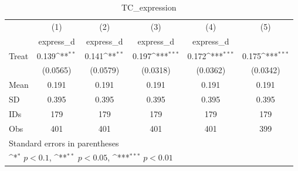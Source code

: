 \begin{table}[htbp]\centering
\def\sym#1{\ifmmode^{#1}\else\(^{#1}\)\fi}
\caption{TC\_expression}
\begin{tabular}{l*{5}{c}}
\hline\hline
                                &\multicolumn{1}{c}{(1)}&\multicolumn{1}{c}{(2)}&\multicolumn{1}{c}{(3)}&\multicolumn{1}{c}{(4)}&\multicolumn{1}{c}{(5)}\\
                                &\multicolumn{1}{c}{express\_d}&\multicolumn{1}{c}{express\_d}&\multicolumn{1}{c}{express\_d}&\multicolumn{1}{c}{express\_d}&\multicolumn{1}{c}{}\\
\hline
Treat                           &    0.139\sym{**} &    0.141\sym{**} &    0.197\sym{***}&    0.172\sym{***}&    0.175\sym{***}\\
                                & (0.0565)         & (0.0579)         & (0.0318)         & (0.0362)         & (0.0342)         \\
\hline
Mean                            &    0.191         &    0.191         &    0.191         &    0.191         &    0.191         \\
SD                              &    0.395         &    0.395         &    0.395         &    0.395         &    0.395         \\
IDs                             &      179         &      179         &      179         &      179         &      179         \\
Obs                             &      401         &      401         &      401         &      401         &      399         \\
\hline\hline
\multicolumn{6}{l}{\footnotesize Standard errors in parentheses}\\
\multicolumn{6}{l}{\footnotesize \sym{*} \(p<0.1\), \sym{**} \(p<0.05\), \sym{***} \(p<0.01\)}\\
\end{tabular}
\end{table}
